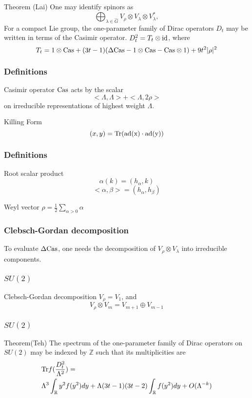 \documentclass{beamer}
\def\Z{{\mathbb Z}}
\def\R{{\mathbb R}}
\def\Cas{{\rm Cas}}
\def\id{{\rm id}}
\def\Tr{{\rm Tr}}
\begin{document}
\begin{frame}
  \begin{block}{Theorem (Lai)}
    One may identify spinors as
	\[
\bigoplus _{\lambda \in \widehat{G}} V_{\rho}\otimes V_\lambda \otimes V_\lambda ^* ,
	\]
    For a compact Lie group, the one-parameter family of Dirac operators $D_t$ may be written in terms of the Casimir operator. $D_t^2 = T_t \otimes \id$, where 
    \[
      T_t = 1 \otimes \Cas + (3t-1)(\Delta \Cas - 1 \otimes \Cas - \Cas \otimes 1) + 9 t^2 |\rho|^2
    \]
  \end{block}
\end{frame}

\begin{frame}
	\frametitle{Definitions}
  \begin{block}{Casimir operator}
    $\Cas$ acts by the scalar 
    \[
    <\Lambda, \Lambda> + <\Lambda, 2 \rho>
    \]
    on irreducible representations of highest weight $\Lambda$.
  \end{block}
	\begin{block}{Killing Form}
	\[
	(x,y) = \Tr(\rm{ad}(x) \cdot \rm{ad}(y))
	\]
	\end{block}
\end{frame}

\begin{frame}
	\frametitle{Definitions}
	\begin{block}{Root scalar product}
	\[
	\alpha(k) = (h_{\alpha}, k)
	\]
	\[
	<\alpha, \beta> = (h_{\alpha}, h_{\beta})
	\]
	\end{block}
	\begin{block}{Weyl vector $\rho = \frac{1}{2} \sum_{\alpha > 0} \alpha$}
	\end{block}
\end{frame}

\begin{frame}
	\frametitle{Clebsch-Gordan decomposition}
	To evaluate $\Delta \Cas$, one needs the decomposition of $V_{\rho} \otimes V_{\lambda}$ into irreducible components.
\end{frame}

\begin{frame}
	\frametitle{$SU(2)$}
	\begin{block}{Clebsch-Gordan decomposition}
		$V_{\rho} = V_{1}$, and 
		\[
		V_{\rho} \otimes V_m = V_{m+1} \oplus V_{m-1}
		\]
	\end{block}
\end{frame}

\begin{frame}
	\frametitle{$SU(2)$}
  \begin{block}{Theorem(Teh)}
	The spectrum of the one-parameter family of Dirac operators on $SU(2)$ may be indexed by $\Z$ such that its multiplicities are 
	\begin{align*}
		& \Tr f( \frac{D_t ^2}{\Lambda ^2}) = \\ 
		&\Lambda ^3 \int_{\R}y^2 f(y^2) dy + \Lambda(3t-1)(3t-2)\int_\R f(y^2) dy + O(\Lambda^{-k})
	\end{align*}
  \end{block}
\end{frame}
\end{document}
